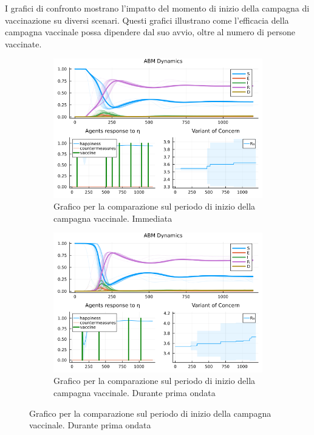 I grafici di confronto mostrano l'impatto del momento di inizio della 
campagna di vaccinazione su diversi scenari. Questi grafici illustrano 
come l'efficacia della campagna vaccinale possa dipendere dal suo avvio, 
oltre al numero di persone vaccinate.

\begin{figure}[H]
	\centering
	\begin{subfigure}[b]{0.45\textwidth}
		\centering
		\includegraphics[width=\textwidth]{img/SocialNetworkABM_1_V.png}
		\caption{Grafico per la comparazione sul periodo di inizio della campagna vaccinale. Immediata}
		\label{fig:comparison_vax_1}
	\end{subfigure}
	\hfill
	\begin{subfigure}[b]{0.45\textwidth}
		\centering
		\includegraphics[width=\textwidth]{img/SocialNetworkABM_4_V.png}
		\caption{Grafico per la comparazione sul periodo di inizio della campagna vaccinale. Durante prima ondata}

\end{subfigure}
\end{figure}
